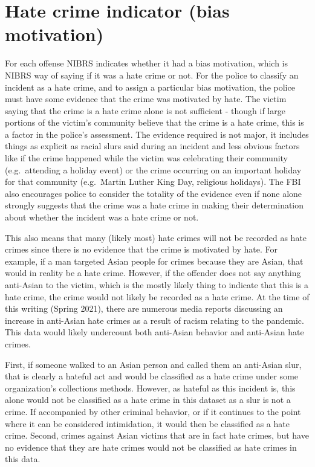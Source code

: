 \documentclass[
  12pt,
  openany]{book}
\begin{document}
\section{Hate crime indicator (bias motivation)}\label{hate-crime-indicator-bias-motivation}

For each offense NIBRS indicates whether it had a bias motivation, which is NIBRS way of saying if it was a hate crime or not. For the police to classify an incident as a hate crime, and to assign a particular bias motivation, the police must have some evidence that the crime was motivated by hate. The victim saying that the crime is a hate crime alone is not sufficient - though if large portions of the victim's community believe that the crime is a hate crime, this is a factor in the police's assessment. The evidence required is not major, it includes things as explicit as racial slurs said during an incident and less obvious factors like if the crime happened while the victim was celebrating their community (e.g.~attending a holiday event) or the crime occurring on an important holiday for that community (e.g.~Martin Luther King Day, religious holidays). The FBI also encourages police to consider the totality of the evidence even if none alone strongly suggests that the crime was a hate crime in making their determination about whether the incident was a hate crime or not.

This also means that many (likely most) hate crimes will not be recorded as hate crimes since there is no evidence that the crime is motivated by hate. For example, if a man targeted Asian people for crimes because they are Asian, that would in reality be a hate crime. However, if the offender does not say anything anti-Asian to the victim, which is the mostly likely thing to indicate that this is a hate crime, the crime would not likely be recorded as a hate crime. At the time of this writing (Spring 2021), there are numerous media reports discussing an increase in anti-Asian hate crimes as a result of racism relating to the pandemic. This data would likely undercount both anti-Asian behavior and anti-Asian hate crimes.

First, if someone walked to an Asian person and called them an anti-Asian slur, that is clearly a hateful act and would be classified as a hate crime under some organization's collections methods. However, as hateful as this incident is, this alone would not be classified as a hate crime in this dataset as a slur is not a crime. If accompanied by other criminal behavior, or if it continues to the point where it can be considered intimidation, it would then be classified as a hate crime. Second, crimes against Asian victims that are in fact hate crimes, but have no evidence that they are hate crimes would not be classified as hate crimes in this data.
\end{document}

